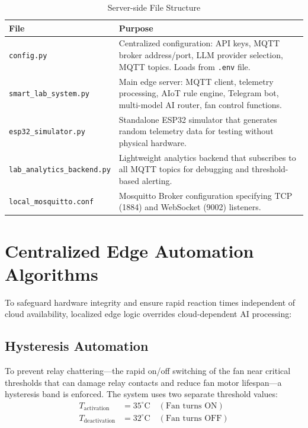 \documentclass[12pt,a4paper]{report}
\begin{document}
\begin{table}[H]
    \centering
    \begin{tabular}{|l|p{9cm}|}
        \hline
        \textbf{File} & \textbf{Purpose} \\ \hline
        \texttt{config.py} & Centralized configuration: API keys, MQTT broker address/port, LLM provider selection, MQTT topics. Loads from \texttt{.env} file. \\ \hline
        \texttt{smart\_lab\_system.py} & Main edge server: MQTT client, telemetry processing, AIoT rule engine, Telegram bot, multi-model AI router, fan control functions. \\ \hline
        \texttt{esp32\_simulator.py} & Standalone ESP32 simulator that generates random telemetry data for testing without physical hardware. \\ \hline
        \texttt{lab\_analytics\_backend.py} & Lightweight analytics backend that subscribes to all MQTT topics for debugging and threshold-based alerting. \\ \hline
        \texttt{local\_mosquitto.conf} & Mosquitto Broker configuration specifying TCP (1884) and WebSocket (9002) listeners. \\ \hline
    \end{tabular}
    \caption{Server-side File Structure}
    \label{tab:file_structure}
\end{table}

\section{Centralized Edge Automation Algorithms}
To safeguard hardware integrity and ensure rapid reaction times independent of cloud availability, localized edge logic overrides cloud-dependent AI processing:

\subsection{Hysteresis Automation}
To prevent relay chattering---the rapid on/off switching of the fan near critical thresholds that can damage relay contacts and reduce fan motor lifespan---a hysteresis band is enforced. The system uses two separate threshold values:
\begin{align}
    T_{\text{activation}} &= 35^{\circ}\text{C} \quad (\text{Fan turns ON}) \\
    T_{\text{deactivation}} &= 32^{\circ}\text{C} \quad (\text{Fan turns OFF})
\end{align}
\end{document}
